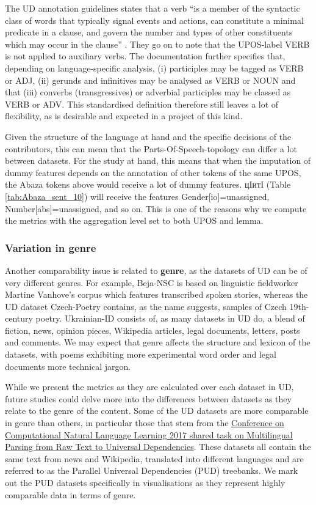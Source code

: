 \documentclass[USenglish]{article}
\begin{document}
The UD annotation guidelines states that a verb ``is a member of the syntactic class of words that typically signal events and actions, can constitute a minimal predicate in a clause, and govern the number and types of other constituents which may occur in the clause'' \citep{ud_2_VERB_website}. 
They go on to note that the UPOS-label VERB is not applied to auxiliary verbs. 
The documentation further specifies that, depending on language-specific analysis, (i) participles may be tagged as VERB or ADJ, (ii) gerunds and infinitives may be analysed as VERB or NOUN and that (iii) converbs (transgressives) or adverbial participles may be classed as VERB or ADV.
This standardised definition therefore still leaves a lot of flexibility, as is desirable and expected in a project of this kind.

Given the structure of the language at hand and the specific decisions of the contributors, this can mean that the Parts-Of-Speech-topology can differ a lot between datasets. 
For the study at hand, this means that when the imputation of dummy features depends on the annotation of other tokens of the same UPOS, the Abaza tokens above would receive a lot of dummy features. 
{\Timesfont цIитI} (Table \ref{tab:Abaza_sent_10}) will receive the features Gender[io]=unassigned, Number[abs]=unassigned, and so on.
This is one of the reasons why we compute the metrics with the aggregation level set to both UPOS and lemma.

\subsubsection{Variation in genre}
\label{sec:caveat_genres}
Another comparability issue is related to \textbf{genre}, as the datasets of UD can be of very different genres. 
For example, Beja-NSC is based on linguistic fieldworker Martine Vanhove's corpus which features transcribed spoken stories, whereas the UD dataset Czech-Poetry contains, as the name suggests, samples of Czech 19th-century poetry. 
Ukrainian-ID consists of, as many datasets in UD do, a blend of fiction, news, opinion pieces, Wikipedia articles, legal documents, letters, posts and comments. 
We may expect that genre affects the structure and lexicon of the datasets, with poems exhibiting more experimental word order and legal documents more technical jargon. 

While we present the metrics as they are calculated over each dataset in UD, future studies could delve more into the differences between datasets as they relate to the genre of the content.
Some of the UD datasets are more comparable in genre than others, in particular those that stem from the \hyperlink{http://universaldependencies.org/conll17/}{Conference on Computational Natural Language Learning 2017 shared task on Multilingual Parsing from Raw Text to Universal Dependencies}.
These datasets all contain the same text from news and Wikipedia, translated into different languages and are referred to as the Parallel Universal Dependencies (PUD) treebanks.
We mark out the PUD datasets specifically in visualisations as they represent highly comparable data in terms of genre.
\end{document}
